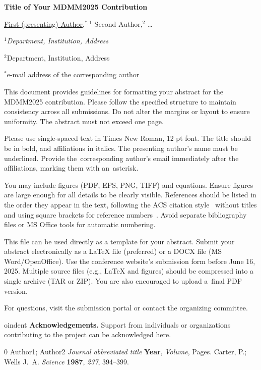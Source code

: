 \documentclass[a4paper, 12pt]{article}
\begin{document}
\begin{center}
	
{\large \bf Title of Your MDMM2025 Contribution}
\bigskip

{\underline{First (presenting) Author},$^{*,1}$
Second Author,$^2$ \dots
}

\smallskip

{\small\it
$^1$Department, Institution, Address 

$^2$Department, Institution, Address
}

{\small
$^*$e-mail address of the corresponding author
}
\end{center}

\bigskip

This document provides guidelines for formatting your abstract for the MDMM2025 contribution. Please follow the specified structure to maintain consistency across all submissions. Do not alter the margins or layout to ensure uniformity. The abstract must not exceed one page.

Please use single-spaced text in Times New Roman, 12 pt font. The title should be in bold, and affiliations in italics. The presenting author's name must be underlined. Provide the~corresponding author’s email immediately after the affiliations, marking them with an~asterisk.

You may include figures (PDF, EPS, PNG, TIFF) and equations. Ensure figures are large enough for all details to be clearly visible. References should be listed in the order they appear in the text, following the ACS citation style~\cite{ref1} without titles and using square brackets for reference numbers~\cite{ref2}. Avoid separate bibliography files or MS Office tools for automatic numbering.

This file can be used directly as a template for your abstract. Submit your abstract electronically as a \LaTeX{} file (preferred) or a DOCX file (MS Word/OpenOffice). Use the conference website’s submission form before June 16, 2025. Multiple source files (e.g., \LaTeX{} and figures) should be compressed into a single archive (TAR or ZIP). You are also encouraged to upload a~final PDF version.

For questions, visit the submission portal or contact the organizing committee.

\smallskip

oindent
{\bf Acknowledgements.} Support from individuals or organizations contributing to the project can be acknowledged here.

\vspace{-10mm}
\begin{thebibliography}{0}
 Author1; Author2 \emph{Journal abbreviated title} \textbf{Year}, \emph{Volume}, Pages.
 Carter, P.; Wells J.~A. \emph{Science} \textbf{1987}, \emph{237}, 394--399.
\end{thebibliography}
\end{document}

